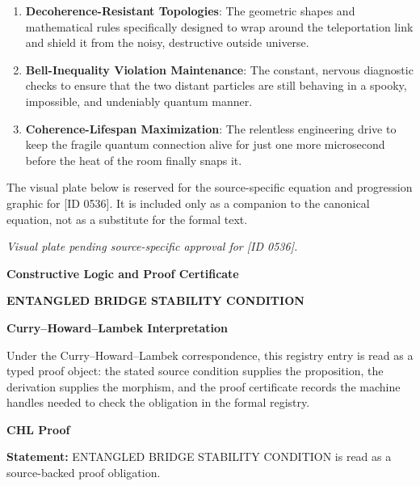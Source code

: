 \begin{enumerate}[leftmargin=1.6em,itemsep=6pt,topsep=4pt]
\item \textbf{Decoherence-Resistant Topologies}: The geometric shapes and mathematical rules specifically designed to wrap around the teleportation link and shield it from the noisy, destructive outside universe.
\item \textbf{Bell-Inequality Violation Maintenance}: The constant, nervous diagnostic checks to ensure that the two distant particles are still behaving in a spooky, impossible, and undeniably quantum manner.
\item \textbf{Coherence-Lifespan Maximization}: The relentless engineering drive to keep the fragile quantum connection alive for just one more microsecond before the heat of the room finally snaps it.
\end{enumerate}

\begingroup\footnotesize\sloppy
The visual plate below is reserved for the source-specific equation and progression graphic for [ID 0536]. It is included only as a companion to the canonical equation, not as a substitute for the formal text.
\par\endgroup
\begingroup\footnotesize\itshape
Visual plate pending source-specific approval for [ID 0536].
\par\endgroup

\clearpage
\begingroup\tzpsupportsetup
\noindent\textbf{\fontsize{10.8pt}{12.8pt}\selectfont [ID 0536] Constructive Logic and Proof Certificate}\par
\noindent\textbf{\fontsize{10pt}{12pt}\selectfont ENTANGLED BRIDGE STABILITY CONDITION}\par
\vspace{0.45em}
\begingroup
\footnotesize
\setlength{\parskip}{0.22em}
\setlength{\parindent}{0pt}
\noindent\textbf{Curry--Howard--Lambek Interpretation}\par
Under the Curry--Howard--Lambek correspondence, this registry entry is read as a typed proof
object: the stated source condition supplies the proposition, the derivation supplies the
morphism, and the proof certificate records the machine handles needed to check the obligation
in the formal registry.

\vspace{0.45em}
\noindent\textbf{CHL Proof}\par
\textbf{Statement:} ENTANGLED BRIDGE STABILITY CONDITION is read as a source-backed proof obligation.

